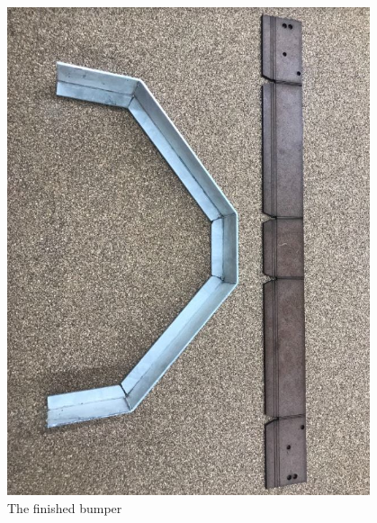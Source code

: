 \begin{figure}[htp]
\centering
  \includegraphics[width=0.95\textwidth]{Meetings/November/11-01-21/11-1-21_Hardware_Figure5 - Nathan Forrer.JPG}
  \caption{The finished bumper}
  \label{fig:pic8}
\end{figure}


